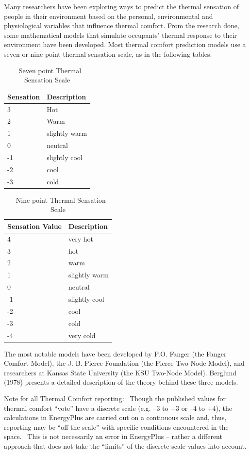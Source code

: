 Many researchers have been exploring ways to predict the thermal sensation of people in their environment based on the personal, environmental and physiological variables that influence thermal comfort. From the research done, some mathematical models that simulate occupants' thermal response to their environment have been developed. Most thermal comfort prediction models use a seven or nine point thermal sensation scale, as in the following tables.

\begin{longtable}[c]{@{}ll@{}}
\caption{  Seven point Thermal Sensation Scale \protect \label{table:seven-point-thermal-sensation-scale}}\\
\toprule 
Sensation & Description \tabularnewline \midrule
\endhead
3 & Hot \tabularnewline
2 & Warm \tabularnewline
1 & slightly warm \tabularnewline
0 & neutral \tabularnewline
-1 & slightly cool \tabularnewline
-2 & cool \tabularnewline
-3 & cold \tabularnewline
\bottomrule
\end{longtable}

\begin{longtable}[c]{@{}ll@{}}
\caption{  Nine point Thermal Sensation Scale \protect \label{table:nine-point-thermal-sensation-scale}}\\
\toprule 
Sensation Value & Description \tabularnewline \midrule
\endhead
4 & very hot \tabularnewline
3 & hot \tabularnewline
2 & warm \tabularnewline
1 & slightly warm \tabularnewline
0 & neutral \tabularnewline
-1 & slightly cool \tabularnewline
-2 & cool \tabularnewline
-3 & cold \tabularnewline
-4 & very cold \tabularnewline
\bottomrule
\end{longtable}

The most notable models have been developed by P.O. Fanger (the Fanger Comfort Model), the J. B. Pierce Foundation (the Pierce Two-Node Model), and researchers at Kansas State University (the KSU Two-Node Model). Berglund (1978) presents a detailed description of the theory behind these three models.

Note for all Thermal Comfort reporting:~ Though the published values for thermal comfort ``vote'' have a discrete scale (e.g. --3 to +3 or --4 to +4), the calculations in EnergyPlus are carried out on a continuous scale and, thus, reporting may be ``off the scale'' with specific conditions encountered in the space.~ This is not necessarily an error in EnergyPlus -- rather a different approach that does not take the ``limits'' of the discrete scale values into account.

